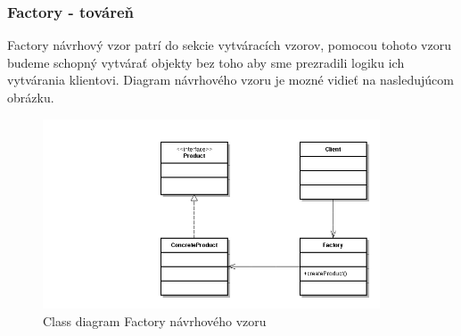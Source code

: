 \subsubsection{Factory - továreň}
\indent Factory návrhový vzor patrí do sekcie vytváracích vzorov, pomocou tohoto vzoru budeme schopný vytvárať objekty bez toho aby sme prezradili logiku ich vytvárania klientovi.
Diagram návrhového vzoru je mozné vidieť na nasledujúcom obrázku.
\begin{figure}[!htbp]
	\centering
	\includegraphics[width=10cm]{img/factory_design_pattern.jpg}
	\caption{Class diagram Factory návrhového vzoru}
	\label{fig:test}
\end{figure}
\newline
